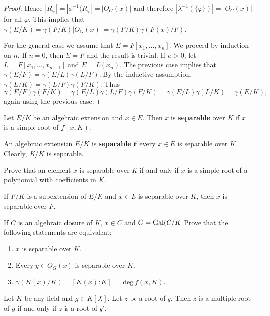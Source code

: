 \begin{proof}
    Hence $|R_\varphi|=|\phi^{-1}(R_{\varphi}|=|O_G(x)|$ and therefore
    $|\lambda^{-1}(\{\varphi\})|=|O_G(x)|$ for all $\varphi$. This implies
    that $\gamma(E/K)=\gamma(F/K)|O_G(x)|=\gamma(F/K)\gamma(F(x)/F)$. 
    
    For the general case we assume that $E=F[x_1,\dots,x_n]$. We proceed
    by induction on $n$. If $n=0$, then $E=F$ and the result is trivial. 
    If $n>0$, let $L=F[x_1,\dots,x_{n-1}]$ and $E=L(x_n)$. The previous
    case implies that $\gamma(E/F)=\gamma(E/L)\gamma(L/F)$. By the inductive 
    assumption, $\gamma(L/K)=\gamma(L/F)\gamma(F/K)$. Thus 
    \[
    \gamma(E/F)\gamma(F/K)=\gamma(E/L)\gamma(L/F)\gamma(F/K)
    =\gamma(E/L)\gamma(L/K)=\gamma(E/K),
    \]
    again using the previous case. 
\end{proof}


\begin{definition}
    Let $E/K$ be an algebraic extension and $x\in E$. Then
    $x$ is \textbf{separable} over $K$ if $x$ is a simple root
    of $f(x,K)$. 
\end{definition}

An algebraic extension $E/K$ is \textbf{separable} 
if every $x\in E$ is separable over $K$. Clearly, $K/K$ is separable. 

\begin{exercise}
    Prove that 
    an element $x$ is separable over $K$ if and only if $x$ is a simple root
    of a polynomial with coefficients in $K$. 
\end{exercise}

If $F/K$ is a subextension of $E/K$ and $x\in E$ is separable over $K$, then
$x$ is separable over $F$. 

\begin{exercise}
     If $C$ is an algebraic closure of $K$, $x\in C$ and $G=\operatorname{Gal}(C/K$
    Prove that the following statements are equivalent:
    \begin{enumerate}
        \item $x$ is separable over $K$.
        \item Every $y\in O_G(x)$ is separable over $K$.
        \item $\gamma(K(x)/K)=[K(x):K]=\deg f(x,K)$. 
    \end{enumerate}
\end{exercise}

Let $K$ be any field and $g\in K[X]$. Let $z$ be a root of $g$. 
Then $z$ is a multiple root of $g$ if and only if $z$ is a root of $g'$. 

